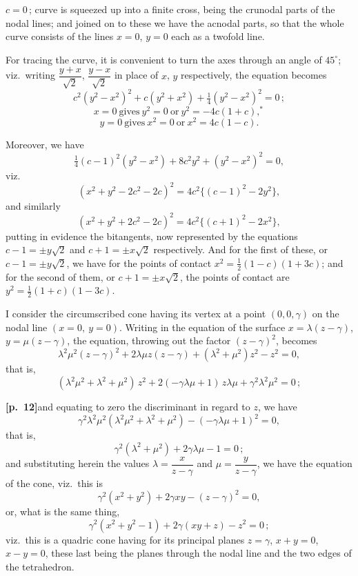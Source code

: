 \documentclass[11pt,a4paper]{article}
\begin{document}
\smallskip

$c = 0$\,; curve is squeezed up into a finite cross, being the crunodal parts of the nodal lines; and joined on to these we have the acnodal parts, so that the whole curve consists of the lines $x = 0$, $y = 0$ each as a twofold line.

\medskip

For tracing the curve, it is convenient to turn the axes through an angle of $45^{\circ}$; viz.\ writing $\dfrac{y + x}{\sqrt{2}}$, $\dfrac{y - x}{\sqrt{2}}$ in place of $x$, $y$ respectively, the equation becomes
\[
c^{2}(y^{2} - x^{2})^{2} + c(y^{2} + x^{2}) + \tfrac{1}{4}(y^{2} - x^{2})^{2} = 0\,;
\]
\[
x = 0\ \text{gives}\ y^{2} = 0\ \text{or}\ y^{2} = -4c(1 + c),^{*}
\]
\[
y = 0\ \text{gives}\ x^{2} = 0\ \text{or}\ x^{2} = 4c(1 - c).
\]

Moreover, we have
\[
\tfrac{1}{4}(c - 1)^{2}(y^{2} - x^{2}) + 8c^{2}y^{2} + (y^{2} - x^{2})^{2} = 0,
\]
viz.
\[
(x^{2} + y^{2} - 2c^{2} - 2c)^{2} = 4c^{2}\{(c - 1)^{2} - 2y^{2}\},
\]
and similarly
\[
(x^{2} + y^{2} + 2c^{2} - 2c)^{2} = 4c^{2}\{(c + 1)^{2} - 2x^{2}\},
\]
putting in evidence the bitangents, now represented by the equations $c - 1 = \pm y\sqrt{2}$ and $c + 1 = \pm x\sqrt{2}$ respectively. And for the first of these, or $c - 1 = \pm y\sqrt{2}$, we have for the points of contact $x^{2} = \tfrac{1}{2}(1 - c)(1 + 3c)$; and for the second of them, or $c + 1 = \pm x\sqrt{2}$, the points of contact are $y^{2} = \tfrac{1}{2}(1 + c)(1 - 3c)$.

\medskip

I consider the circumscribed cone having its vertex at a point $(0, 0, \gamma)$ on the nodal line $(x=0,\ y=0)$. Writing in the equation of the surface $x = \lambda(z - \gamma)$, $y = \mu(z - \gamma)$, the equation, throwing out the factor $(z - \gamma)^{2}$, becomes
\[
\lambda^{2}\mu^{2}(z - \gamma)^{2} + 2\lambda\mu z(z - \gamma) + (\lambda^{2} + \mu^{2}) z^{2} - z^{2} = 0,
\]
that is,
\[
(\lambda^{2}\mu^{2} + \lambda^{2} + \mu^{2})\, z^{2} + 2(-\gamma\lambda\mu + 1)\, z\lambda\mu + \gamma^{2}\lambda^{2}\mu^{2} = 0\,;
\]

\smallskip


\bigskip

\noindent\textbf{[p.~12]}\quad and equating to zero the discriminant in regard to $z$, we have
\[
\gamma^{2}\lambda^{2}\mu^{2}(\lambda^{2}\mu^{2} + \lambda^{2} + \mu^{2}) - (-\gamma\lambda\mu + 1)^{2} = 0,
\]
that is,
\[
\gamma^{2}(\lambda^{2} + \mu^{2}) + 2\gamma\lambda\mu - 1 = 0\,;
\]
and substituting herein the values $\lambda = \dfrac{x}{z - \gamma}$ and $\mu = \dfrac{y}{z - \gamma}$, we have the equation of the cone, viz.\ this is
\[
\gamma^{2}(x^{2} + y^{2}) + 2\gamma xy - (z - \gamma)^{2} = 0,
\]
or, what is the same thing,
\[
\gamma^{2}(x^{2} + y^{2} - 1) + 2\gamma(xy + z) - z^{2} = 0\,;
\]
viz.\ this is a quadric cone having for its principal planes $z = \gamma$, $x + y = 0$, $x - y = 0$, these last being the planes through the nodal line and the two edges of the tetrahedron.
\end{document}
